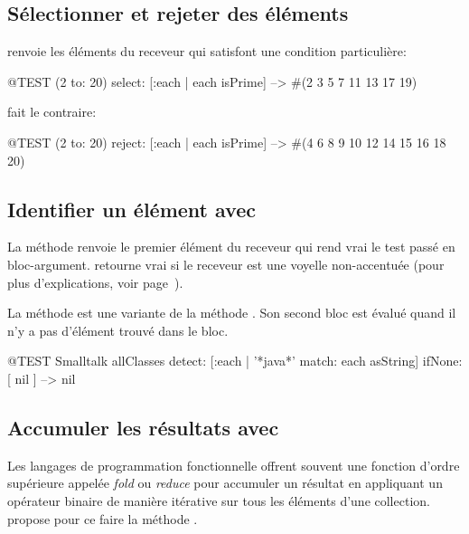 \documentclass[a4paper,10pt,twoside]{book}
\begin{document}
\subsection{S\'electionner et rejeter des \'el\'ements}

 renvoie les \'el\'ements du receveur qui satisfont
une condition particuli\`ere:

\begin{code}{@TEST}
(2 to: 20) select: [:each | each isPrime] --> #(2 3 5 7 11 13 17 19)
\end{code}

 fait le contraire:
\begin{code}{@TEST}
(2 to: 20) reject: [:each | each isPrime] --> #(4 6 8 9 10 12 14 15 16 18 20)
\end{code}

\subsection{Identifier un \'el\'ement avec }

La m\'ethode  renvoie le premier
\'el\'ement du receveur qui rend vrai le test pass\'e en bloc-argument.
 retourne vrai \cad {} si le receveur est une
voyelle non-accentu\'ee (pour plus d'explications, voir page~\pageref{def:isVowel}).

La m\'ethode  est une variante de la m\'ethode . Son second bloc est \'evalu\'e quand il n'y a pas d'\'el\'ement trouv\'e dans le bloc.

\begin{code}{@TEST}
Smalltalk allClasses detect: [:each | '*java*' match: each asString] ifNone: [ nil ] --> nil
\end{code}

\subsection{Accumuler les r\'esultats avec }
Les langages de programmation fonctionnelle offrent souvent une fonction d'ordre
sup\'erieure appel\'ee \emph{fold} ou \emph{reduce} pour accumuler un r\'esultat
en appliquant un op\'erateur binaire de mani\`ere it\'erative sur tous les
\'el\'ements d'une collection.
\sq propose pour ce faire la m\'ethode .
\end{document}
